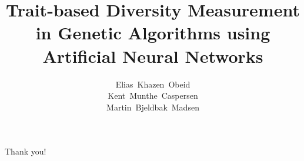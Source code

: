 \documentclass[xcolor=pdftex]{beamer}
\title{Trait-based Diversity Measurement in Genetic Algorithms using Artificial Neural Networks}
\author{%
  Elias~Khazen~Obeid\\
  Kent~Munthe~Caspersen\\
  Martin~Bjeldbak~Madsen
}
\institute{%
  Aalborg University\\
  Department of Computer Science
}
\date{\formatdate{23}{6}{2014}}
\begin{document}
{%
\frame{\titlepage}
}





\begin{frame}[plain,c]
  \begin{center}
    \Huge Thank you!
  \end{center}
\end{frame}
\end{document}
